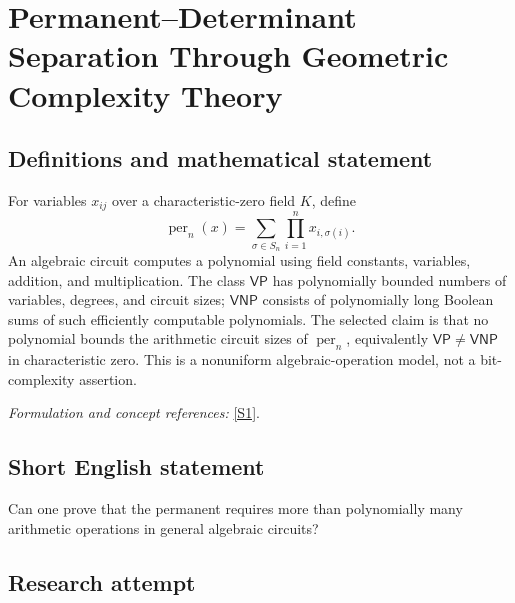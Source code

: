 \documentclass[11pt,a4paper]{article}
\newcommand{\sref}[2]{\hyperlink{source:#1:#2}{[S#2]}}
\newif\ifshowcatalogue
\newcommand{\cataloguescope}[1]{\ifshowcatalogue
 \paragraph{Exact scope in the supplied catalogue.}
 \begin{quote}\small #1\end{quote}\fi}
\numberwithin{equation}{section}
\begin{document}
\setcounter{section}{0}
\clearpage
\section*{\texorpdfstring{Permanent–Determinant Separation Through Geometric Complexity Theory}{Permanent–Determinant Separation Through Geometric Complexity Theory}}\label{30001375}
\subsection{Definitions and mathematical statement}
For variables $x_{ij}$ over a characteristic-zero field $K$, define
\[
 \operatorname{per}_n(x)=\sum_{\sigma\in S_n}\prod_{i=1}^n x_{i,\sigma(i)}.
\]
An algebraic circuit computes a polynomial using field constants, variables, addition, and multiplication. The class $\mathsf{VP}$ has polynomially bounded numbers of variables, degrees, and circuit sizes; $\mathsf{VNP}$ consists of polynomially long Boolean sums of such efficiently computable polynomials. The selected claim is that no polynomial bounds the arithmetic circuit sizes of $\operatorname{per}_n$, equivalently $\mathsf{VP}\ne\mathsf{VNP}$ in characteristic zero. This is a nonuniform algebraic-operation model, not a bit-complexity assertion.
\par\smallskip\textit{Formulation and concept references:} \sref{30001375}{1}.
\cataloguescope{Prove that the permanent polynomial family cannot be computed by polynomial-size algebraic circuits over fields of characteristic zero, equivalently that VP is not equal to VNP.}
\subsection{Short English statement}
Can one prove that the permanent requires more than polynomially many arithmetic operations in general algebraic circuits?
\subsection{Research attempt}
\end{document}
